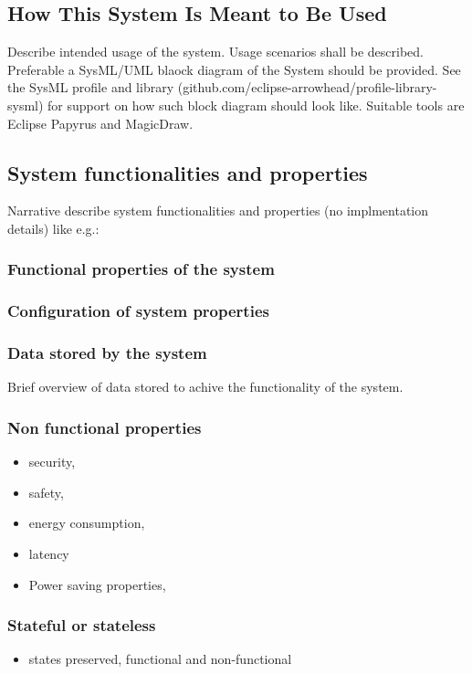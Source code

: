 \message{ !name(GSoSD_foundational principle developments.tex)}\documentclass[a4paper]{arrowhead}
\begin{document}
\subsection{How This System Is Meant to Be Used}
\label{sec:use}

\color{red}
Describe intended usage of the system. Usage scenarios
shall be described. Preferable a SysML/UML blaock diagram of the
System should be provided. See the SysML profile and library
(github.com/eclipse-arrowhead/profile-library-sysml) for
support on how such block diagram should look like. Suitable tools are
Eclipse Papyrus and MagicDraw.
\color{black}  

\subsection{System functionalities and properties}
\label{sec:properties}

\color{red}
Narrative describe system functionalities and properties (no
implmentation details) like e.g.:

\subsubsection {Functional properties of the system}

\subsubsection {Configuration of system properties}


\subsubsection {Data stored by the system}
Brief overview of data stored to achive the functionality of the system. 

\subsubsection {Non functional properties}
\begin{itemize}
  \item security, 
  \item safety, 
  \item energy consumption,
  \item latency
  \item Power saving properties, 
\end{itemize}


\subsubsection {Stateful or stateless}
\begin{itemize} 
\item states preserved, functional and non-functional
\end{itemize}  
\color{black}  
\end{document}
